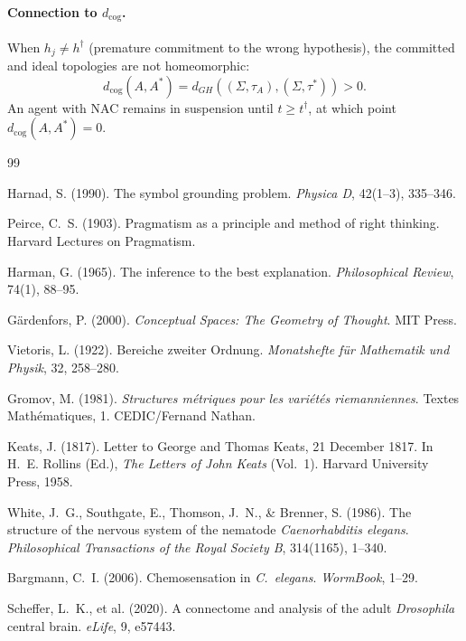 \documentclass[12pt]{article}
\begin{document}
\paragraph{Connection to $d_\mathrm{cog}$.}
When $h_j \neq h^\dagger$ (premature commitment to the wrong
hypothesis), the committed and ideal topologies are not homeomorphic:
\[
d_\mathrm{cog}(A, A^*) = d_{GH}((\Sigma, \tau_A), (\Sigma, \tau^*)) > 0.
\]
An agent with NAC remains in suspension until $t \geq t^\dagger$,
at which point $d_\mathrm{cog}(A, A^*) = 0$.

\begin{thebibliography}{99}

Harnad, S. (1990).
The symbol grounding problem.
\textit{Physica D}, 42(1--3), 335--346.

Peirce, C.~S. (1903).
Pragmatism as a principle and method of right thinking.
Harvard Lectures on Pragmatism.

Harman, G. (1965).
The inference to the best explanation.
\textit{Philosophical Review}, 74(1), 88--95.

G\"{a}rdenfors, P. (2000).
\textit{Conceptual Spaces: The Geometry of Thought}.
MIT Press.

Vietoris, L. (1922).
Bereiche zweiter Ordnung.
\textit{Monatshefte f\"{u}r Mathematik und Physik}, 32, 258--280.

Gromov, M. (1981).
\textit{Structures m\'{e}triques pour les vari\'{e}t\'{e}s
riemanniennes}.
Textes Math\'{e}matiques, 1. CEDIC/Fernand Nathan.

Keats, J. (1817).
Letter to George and Thomas Keats, 21 December 1817.
In H.~E. Rollins (Ed.),
\textit{The Letters of John Keats} (Vol.~1).
Harvard University Press, 1958.

White, J.~G., Southgate, E., Thomson, J.~N., \& Brenner, S. (1986).
The structure of the nervous system of the nematode
\textit{Caenorhabditis elegans}.
\textit{Philosophical Transactions of the Royal Society B},
314(1165), 1--340.

Bargmann, C.~I. (2006).
Chemosensation in \textit{C.~elegans}.
\textit{WormBook}, 1--29.

Scheffer, L.~K., et al. (2020).
A connectome and analysis of the adult \textit{Drosophila} central
brain.
\textit{eLife}, 9, e57443.


\end{thebibliography}
\end{document}
